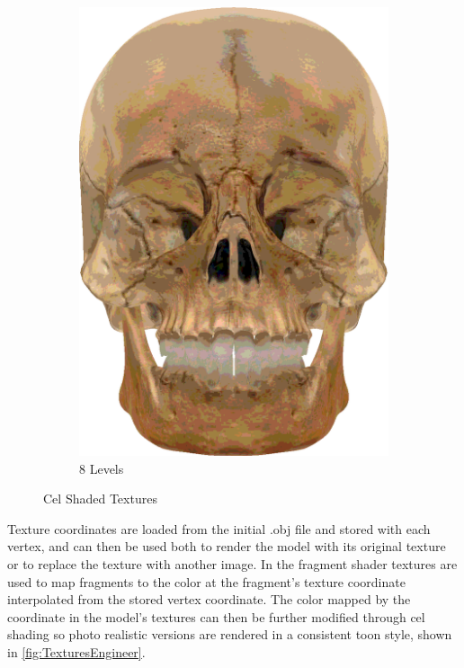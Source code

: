 \begin{figure}[h]
\begin{subfigure}[b]{0.16\textwidth}
        \includegraphics[width=\textwidth]{img/textures/CelShadeTexture8Skull.png}
        \caption{8 Levels}
        \label{fig:CelShadeTexture8Skull}
    \end{subfigure}
    \caption{Cel Shaded Textures}
    \label{fig:TexturesEngineer}
\end{figure}

Texture coordinates are loaded from the initial .obj file and stored with each vertex, and can then be used 
both to render the model with its original texture or to replace the texture with another image. In the fragment 
shader textures are used to map fragments to the color at the fragment's texture coordinate interpolated from the 
stored vertex coordinate. The color mapped by the coordinate in the model's textures can then be further modified 
through cel shading so photo realistic versions are rendered in a consistent toon style, shown in \autoref{fig:TexturesEngineer}.


